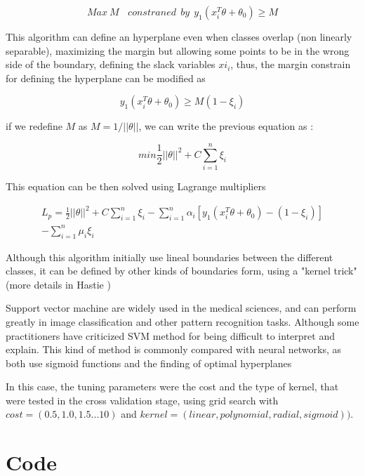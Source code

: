 \documentclass[10pt,twocolumn,letterpaper]{article}
\begin{document}
\begin{equation}
Max \: M \:\:\:\: constraned \:\:by  \:\: y_1(x_i^T \theta + \theta_0) \geq M
\end{equation}

This algorithm can define an hyperplane even when classes overlap (non linearly separable), maximizing the margin but allowing some points to be in the wrong side of the boundary, defining the slack variables $xi_i$, thus, the margin constrain for defining the hyperplane can be modified as \cite{Hastie2009}

\begin{equation}
y_1(x_i^T \theta + \theta_0) \geq M(1-\xi_i) 
\end{equation}

if we redefine $M$ as $M = 1/||\theta||$, we can write the previous equation as \cite{Hastie2009}:

\begin{equation}
min \frac{1}{2}||\theta||^2 + C \sum^n_{i=1}\xi_i
\end{equation}

This equation can be then solved using Lagrange multipliers \cite{Hastie2009}

\begin{multline}
L_p = \frac{1}{2}||\theta||^2 + C \sum^n_{i=1}\xi_i - \sum^n_{i=1}\alpha_i[y_1(x_i^T \theta + \theta_0) - (1-\xi_i)] \\ - \sum^n_{i=1}\mu_i\xi_i
\end{multline}

Although this algorithm initially use lineal boundaries between the different classes, it can be defined by other kinds of boundaries form, using a "kernel trick" (more details in Hastie \cite{Hastie2009})

Support vector machine are widely used in the medical sciences, and can perform greatly in image classification and other pattern recognition tasks. Although some practitioners have criticized SVM method for being difficult to interpret and explain. This kind of method is commonly compared with neural networks, as both use sigmoid functions and the finding of optimal hyperplanes \cite{Bell2014}

In this case, the tuning parameters were the cost and the type of kernel, that were tested in the cross validation stage, using grid search with $cost = (0.5,1.0,1.5...10)$ and $kernel = (linear, polynomial, radial, sigmoid))$. 

\section{Code}
\end{document}
